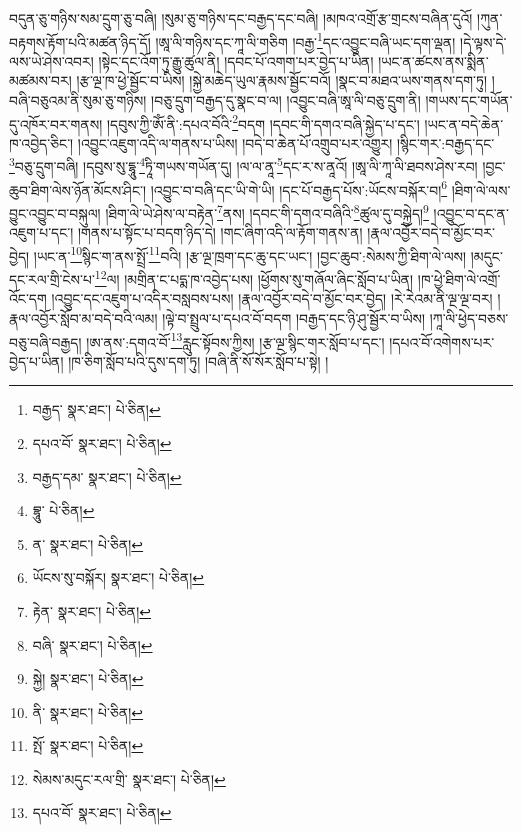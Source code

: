 བདུན་ཅུ་གཉིས་སམ་དྲུག་ཅུ་བཞི། །སུམ་ཅུ་གཉིས་དང་བརྒྱད་དང་བཞི། །མཁའ་འགྲོ་རྩ་གྲངས་བཞིན་དུའོ། །ཀུན་བརྟགས་རྟོག་པའི་མཚན་ཉིད་དོ། །ཨཱ་ལི་གཉིས་དང་ཀཱ་ལི་གཅིག །བརྒྱ་\footnote{བརྒྱད་  སྣར་ཐང་།  པེ་ཅིན། }དང་འབྱུང་བཞི་ཡང་དག་ལྡན། །དེ་ལྟས་དེ་ལས་ཡེ་ཤེས་འབར། །སྟེང་དང་འོག་ཏུ་རྒྱུ་ཚུལ་ནི། །དབང་པོ་འགག་པར་བྱེད་པ་ཡིན། །ཡང་ན་ཚངས་ནས་སྨིན་མཚམས་བར། །རྩ་ལྔ་ཁ་ཕྱེ་སྦྱོང་བ་ཡིས། །སྐྱེ་མཆེད་ཡུལ་རྣམས་སྦྱོང་བའོ། །སྣང་བ་མཐའ་ཡས་གནས་དག་ཏུ། །བཞི་བཅུའམ་ནི་སུམ་ཅུ་གཉིས། །བཅུ་དྲུག་བརྒྱད་དུ་སྣང་བ་ལ། །འབྱུང་བཞི་ཨཱ་ལི་བཅུ་དྲུག་ནི། །གཡས་དང་གཡོན་དུ་འཁོར་བར་གནས། །དབུས་ཀྱི་ཨོཾ་ནི་:དཔའ་བོའི་\footnote{དཔའ་བོ་  སྣར་ཐང་།  པེ་ཅིན། }བདག །དབང་གི་དགའ་བཞི་སྐྱེད་པ་དང་། །ཡང་ན་བདེ་ཆེན་ཁ་འབྱེད་ཅིང་། །འབྱུང་འཇུག་འདི་ལ་གནས་པ་ཡིས། །བདེ་བ་ཆེན་པོ་འགྲུབ་པར་འགྱུར། །སྙིང་གར་:བརྒྱད་དང་\footnote{བརྒྱད་དམ་  སྣར་ཐང་།  པེ་ཅིན། }བཅུ་དྲུག་བཞི། །དབུས་སུ་དྷཱུ་\footnote{བྷཱུ་  པེ་ཅིན། }ཏཱི་གཡས་གཡོན་དུ། །ལ་ལ་ནཱ་\footnote{ན་  སྣར་ཐང་།  པེ་ཅིན། }དང་ར་ས་ནཱའོ། །ཨཱ་ལི་ཀཱ་ལི་ཐབས་ཤེས་རབ། །བྱང་ཆུབ་ཐིག་ལེས་ཉོན་མོངས་ཤིང་། །འབྱུང་བ་བཞི་དང་ཡི་གེ་ཡི། །དང་པོ་བརྒྱད་པོས་:ཡོངས་བསྐོར་བ།\footnote{ཡོངས་སུ་བསྐོར།  སྣར་ཐང་།  པེ་ཅིན། } །ཐིག་ལེ་ལས་བྱུང་འབྱུང་བ་བསྐུལ། །ཐིག་ལེ་ཡེ་ཤེས་ལ་བརྟེན་\footnote{རྟེན་  སྣར་ཐང་།  པེ་ཅིན། }ནས། །དབང་གི་དགའ་བཞིའི་\footnote{བཞི་  སྣར་ཐང་།  པེ་ཅིན། }ཚུལ་དུ་བསྐྱེད།\footnote{སྐྱེ།  སྣར་ཐང་།  པེ་ཅིན། } །འབྱུང་བ་དང་ན་འཇུག་པ་དང་། །གནས་པ་སྟོང་པ་བདག་ཉིད་དེ། །གང་ཞིག་འདི་ལ་རྟོག་གནས་ན། །རྣལ་འབྱོར་བདེ་བ་མྱོང་བར་བྱེད། །ཡང་ན་\footnote{ནི་  སྣར་ཐང་།  པེ་ཅིན། }སྙིང་ག་ནས་སྤྲོ་\footnote{སྤོ་  སྣར་ཐང་།  པེ་ཅིན། }བའི། །རྩ་ལྔ་ཁྲག་དང་ཆུ་དང་ཡང་། །བྱང་ཆུབ་:སེམས་ཀྱི་ཐིག་ལེ་ལས། །མདུང་དང་རལ་གྲི་ངེས་པ་\footnote{སེམས་མདུང་རལ་གྲི་  སྣར་ཐང་།  པེ་ཅིན། }ལ། །མགྲིན་ང་པདྨ་ཁ་འབྱེད་པས། །ཕྱོགས་སུ་གཞོལ་ཞིང་སློབ་པ་ཡིན། །ཁ་ཕྱེ་ཐིག་ལེ་འགྲོ་འོང་དག །འབྱུང་དང་འཇུག་པ་འདིར་བསླབས་པས། །རྣལ་འབྱོར་བདེ་བ་མྱོང་བར་བྱེད། །རེ་རེའམ་ནི་ལྔ་ལྔ་བར། །རྣལ་འབྱོར་སློབ་མ་བདེ་བའི་ལམ། །ལྟེ་བ་སྤྲུལ་པ་དཔའ་བོ་བདག །བརྒྱད་དང་ཉི་ཤུ་སྦྱོར་བ་ཡིས། །ཀཱ་ལི་ཕྱེད་བཅས་བཅུ་བཞི་བརྒྱད། །ཨ་ནས་:དགའ་བོ་\footnote{དཔའ་བོ་  སྣར་ཐང་།  པེ་ཅིན། }རླུང་སྟོབས་ཀྱིས། །རྩ་ལྔ་སྙིང་གར་སློབ་པ་དང་། །དཔའ་བོ་འགེགས་པར་བྱེད་པ་ཡིན། །ཁ་ཅིག་སློབ་པའི་དུས་དག་ཏུ། །བཞི་ནི་སོ་སོར་སློབ་པ་སྟེ། །
